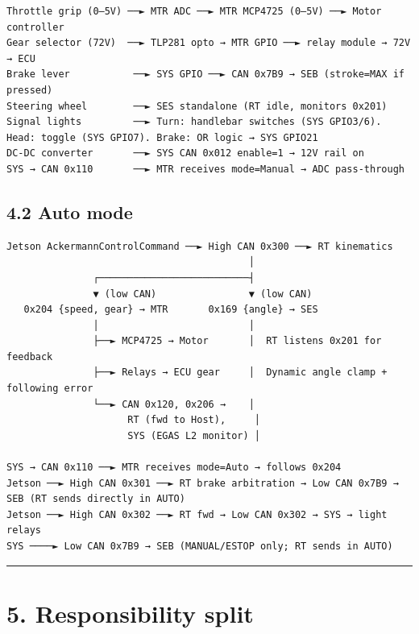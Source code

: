 \documentclass[12pt,a4paper,oneside]{report}
\begin{document}
\begin{verbatim}
Throttle grip (0–5V) ──► MTR ADC ──► MTR MCP4725 (0–5V) ──► Motor controller
Gear selector (72V)  ──► TLP281 opto → MTR GPIO ──► relay module → 72V → ECU
Brake lever           ──► SYS GPIO ──► CAN 0x7B9 → SEB (stroke=MAX if pressed)
Steering wheel        ──► SES standalone (RT idle, monitors 0x201)
Signal lights         ──► Turn: handlebar switches (SYS GPIO3/6). Head: toggle (SYS GPIO7). Brake: OR logic → SYS GPIO21
DC-DC converter       ──► SYS CAN 0x012 enable=1 → 12V rail on
SYS → CAN 0x110       ──► MTR receives mode=Manual → ADC pass-through
\end{verbatim}

\subsection{4.2 Auto mode}\label{auto-mode}

\begin{verbatim}
Jetson AckermannControlCommand ──► High CAN 0x300 ──► RT kinematics
                                          │
               ┌──────────────────────────┤
               ▼ (low CAN)                ▼ (low CAN)
   0x204 {speed, gear} → MTR       0x169 {angle} → SES
               │                          │
               ├──► MCP4725 → Motor       │  RT listens 0x201 for feedback
               ├──► Relays → ECU gear     │  Dynamic angle clamp + following error
               └──► CAN 0x120, 0x206 →    │
                     RT (fwd to Host),     │
                     SYS (EGAS L2 monitor) │

SYS → CAN 0x110 ──► MTR receives mode=Auto → follows 0x204
Jetson ──► High CAN 0x301 ──► RT brake arbitration → Low CAN 0x7B9 → SEB (RT sends directly in AUTO)
Jetson ──► High CAN 0x302 ──► RT fwd → Low CAN 0x302 → SYS → light relays
SYS ────► Low CAN 0x7B9 → SEB (MANUAL/ESTOP only; RT sends in AUTO)
\end{verbatim}

\begin{center}\rule{0.5\linewidth}{0.5pt}\end{center}

\section{5. Responsibility split}\label{responsibility-split}
\end{document}
